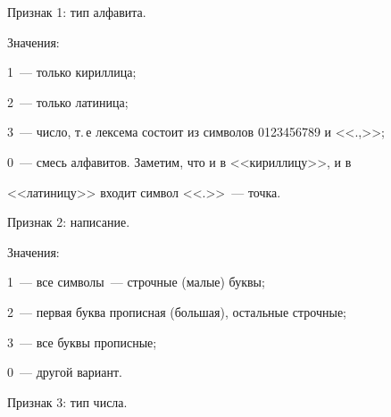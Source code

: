    


   \smallskip


   Признак 1: тип алфавита. 


   


   Значения: 


   


   1~--- только кириллица; 


   


   2~--- только латиница; 


   


   3~---  число, т.\,е лексема состоит из символов 0123456789 и <<.,>>; 


   


   0~--- смесь алфавитов. Заметим, что и в <<кириллицу>>, и в 


<<латиницу>> входит символ <<.>>~--- точка. 


   


   \smallskip


   


   Признак 2: написание. 


   


   Значения: 


   


   1~--- все символы~--- строчные (малые) буквы; 


   


   2~---  первая буква прописная (большая), остальные строчные; 


   


   3~---  все буквы прописные; 


   


   0~---  другой вариант.


   


   \smallskip


   


   Признак 3: тип числа. 


   


